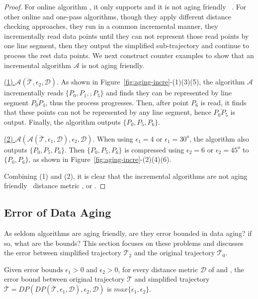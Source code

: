 \begin{proof}
	For online algorithm \squishe, it only supports \sed and it is not aging friendly \wrt~\sed.
	For other online and one-pass algorithms, though they apply different distance checking approaches, they run in a common incremental manner, \ie they incrementally read data points until they can not represent those read points by one line segment, then they output the simplified sub-trajectory and continue to process the rest data points. We next construct counter examples to show that an incremental algorithm $\mathcal{A}$ is not aging friendly.
	
	\underline{(1) ${\mathcal{A}}(\dddot{\mathcal{T}}, \epsilon_2, \mathcal{D})$}. As shown in Figure~\ref{fig:aging-incre}-(1)(3)(5), the algorithm $\mathcal{A}$ incrementally reads $\{P_0, P_1,\dddot, P_5\}$ and finds they can be represented by line segment $\overline{P_0P_4}$, thus the process progresses. Then, after point $P_6$ is read, it finds that these points can not be represented by any line segment, hence $\overline{P_0P_5}$ is output. Finally, the algorithm outputs $\{P_0, P_5, P_6\}$.
	
	\underline{(2) ${\mathcal{A}}(\mathcal{A}(\dddot{\mathcal{T}}, \epsilon_1, \mathcal{D}), \epsilon_2, \mathcal{D})$}. When using $\epsilon_1=4$ or $\epsilon_1=30^o $, the algorithm also outputs $\{P_0, P_5, P_6\}$. Then $\{P_0, P_5, P_6\}$ is compressed using $\epsilon_2=6$ or $\epsilon_2=45^o$ to $\{P_0, P_6\}$, as shown in Figure~\ref{fig:aging-incre}-(2)(4)(6).
	
	Combining (1) and (2), it is clear that the incremental algorithms are not aging friendly \wrt~distance metric \ped, \sed or \dad.
\end{proof}



\subsection{Error of Data Aging}
As seldom algorithms are aging friendly, are they error bounded in data aging? if so, what are the bounds?
%
This section focuses on these problems and discusses the error between simplified trajectory $\overline{\mathcal{T}}_2$ and the original trajectory $\dddot{\mathcal{T}_0}$.

\begin{theorem}
	\label{theo-aging-error-dp}
	Given error bounds $\epsilon_1>0$ and $\epsilon_2>0$, for every distance metric $\mathcal{D}$ of \ped and \sed, the error bound between original trajectory $\dddot{\mathcal{T}}$ and simplified trajectory $\overline{\mathcal{T}}=DP(DP(\dddot{\mathcal{T}}, \epsilon_1, \mathcal{D}), \epsilon_2, \mathcal{D})$ is $max\{\epsilon_1, \epsilon_2\}$.
\end{theorem}

